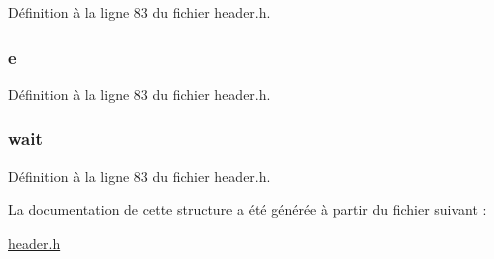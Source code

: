 Définition à la ligne 83 du fichier header.\+h.

\hypertarget{structt__skill__list_aa756d3dbc91762775cff0f4b52526a70}{
\subsubsection[{e}]{ e}}\label{structt__skill__list_aa756d3dbc91762775cff0f4b52526a70}


Définition à la ligne 83 du fichier header.\+h.

\hypertarget{structt__skill__list_a2a4af1a4acb8da6061990f9bd8d0a564}{
\subsubsection[{wait}]{ wait}}\label{structt__skill__list_a2a4af1a4acb8da6061990f9bd8d0a564}


Définition à la ligne 83 du fichier header.\+h.



La documentation de cette structure a été générée à partir du fichier suivant \+:\begin{DoxyCompactItemize}
\item 
\hyperlink{header_8h}{header.\+h}\end{DoxyCompactItemize}
